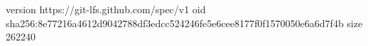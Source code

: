 version https://git-lfs.github.com/spec/v1
oid sha256:8e77216a4612d9042788df3edcc524246fe5e6cee8177f0f1570050e6a6d7f4b
size 262240
